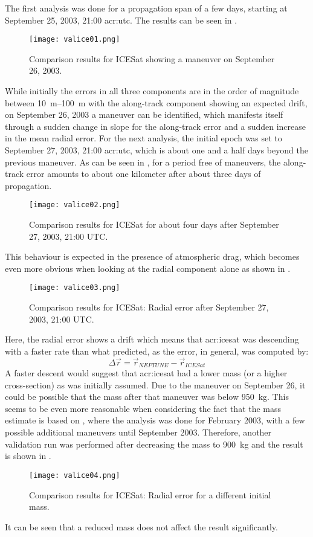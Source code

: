 The first analysis was done for a propagation span of a few days, starting at September 25, 2003, 21:00 \acrshort{acr:utc}. The results can be seen in 
.
\begin{figure}[!h]
 \centering
 \texttt{[image: valice01.png]}
 \caption{Comparison results for ICESat showing a maneuver on September 26, 2003.\label{fig:val-ice-01}}
\end{figure}
While initially the errors in all three components are in the order of magnitude between \SIrange{10}{100}{\metre} with the along-track component showing an expected drift, on September 26, 2003 a maneuver can be identified, which manifests itself through a sudden change in slope for the along-track error and a sudden increase in the 
mean radial error. 
For the next analysis, the initial epoch was set to September 27, 2003, 21:00 \gls{acr:utc}, which is about one and a half days beyond the previous maneuver. 
As can be seen in , for a period free of maneuvers, the along-track error amounts to about one kilometer after about three days of 
propagation.
\begin{figure}[!h]
 \centering
 \texttt{[image: valice02.png]}
 \caption{Comparison results for ICESat for about four days after September 27, 2003, 21:00 UTC.\label{fig:val-ice-02}}
\end{figure}
This behaviour is expected in the presence of atmospheric drag, which becomes even more obvious when looking at the radial component alone as shown in 
.
\begin{figure}[!h]
 \centering
 \texttt{[image: valice03.png]}
 \caption{Comparison results for ICESat: Radial error after September 27, 2003, 21:00 UTC.\label{fig:val-ice-03}}
\end{figure}
Here, the radial error shows a drift which means that \gls{acr:icesat} was descending with a faster rate than what \neptune{} predicted, as the error, in 
general, was computed by:
\begin{equation}
 \Delta \vec{r} = \vec{r}_{NEPTUNE} - \vec{r}_{ICESat}
\end{equation}
A faster descent would suggest that \gls{acr:icesat} had a lower mass (or a higher cross-section) as was initially assumed. Due to the maneuver on September 
26, it could be possible that the mass after that maneuver was below \SI{950}{\kilogram}. This seems to be even more reasonable when considering the fact that the mass 
estimate is based on \cite{vallado2007}, where the analysis was done for February 2003, with a few possible additional maneuvers until September 2003. Therefore, another validation run was performed after decreasing the mass to \SI{900}{\kilogram} and the result is shown in .
\begin{figure}[!h]
 \centering
 \texttt{[image: valice04.png]}
 \caption{Comparison results for ICESat: Radial error for a different initial mass.\label{fig:val-ice-04}}
\end{figure}
It can be seen that a reduced mass does not affect the result significantly. 

